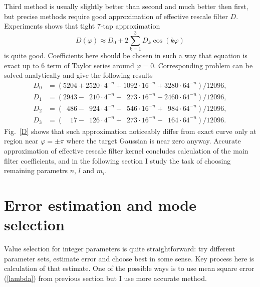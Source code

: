 \documentclass[10pt]{article}
\begin{document}
Third method is usually slightly better than second and much better then first, but precise methods
require good approximation of effective rescale filter $D$. Experiments shows that tight 7-tap
approximation
\begin{equation}
    D(\varphi) \approx D_0 + 2\sum_{k=1}^3 D_k\cos(k\varphi)
\end{equation}
is quite good. Coefficients here should be chosen in such a way that equation is exact up to 6
term of Taylor series around $\varphi = 0$. Corresponding problem can be solved analytically
and give the following results
\newcommand\0{\phantom{0}}
\begin{align}
    D_0 &= (   5204 +   2520\cdot4^{-n} +   1092\cdot16^{-n} +   3280\cdot64^{-n}) / 12096,\\
    D_1 &= (   2943 - \0 210\cdot4^{-n} - \0 273\cdot16^{-n} -   2460\cdot64^{-n}) / 12096,\\
    D_2 &= (\0  486 - \0 924\cdot4^{-n} - \0 546\cdot16^{-n} + \0 984\cdot64^{-n}) / 12096,\\
    D_3 &= (\0\0 17 - \0 126\cdot4^{-n} + \0 273\cdot16^{-n} - \0 164\cdot64^{-n}) / 12096.
\end{align}
Fig.~\ref{D} shows that such approximation noticeably differ from exact curve only at region near
$\varphi = \pm\pi$ where the target Gaussian is near zero anyway. Accurate approximation of
effective rescale filter kernel concludes calculation of the main filter coefficients, and in the
following section I study the task of choosing remaining parametrs $n$, $l$ and $m_i$.


\section{Error estimation and mode selection}

Value selection for integer parameters is quite straightforward: try different parameter sets,
estimate error and choose best in some sense. Key process here is calculation of that estimate. One
of the possible ways is to use mean square error (\ref{lambda}) from previous section but I use
more accurate method.
\end{document}
